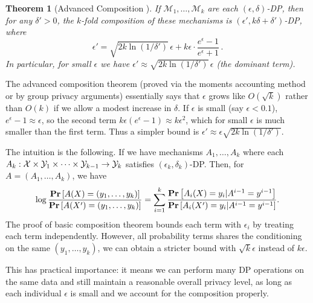 \documentclass[11pt, a4paper]{article}
\newtheorem{theorem}{Theorem}
\begin{document}
\begin{theorem}[Advanced Composition \cite{DworkRoth2014}]
If $\mathcal{M}_1, \dots, \mathcal{M}_k$ are each $(\epsilon,\delta)$-DP, then for any $\delta' > 0$, the $k$-fold composition of these mechanisms is $(\epsilon', k\delta + \delta')$-DP, where 
\[ \epsilon' = \sqrt{2k \ln(1/\delta')} \,\epsilon + k\epsilon \cdot \frac{e^\epsilon - 1}{e^\epsilon+1}\,. \] 
In particular, for small $\epsilon$ we have $\epsilon' \approx \sqrt{2k \ln(1/\delta')} \,\epsilon$ (the dominant term).
\end{theorem}

The advanced composition theorem (proved via the moments accounting method or by group privacy arguments)
essentially says that $\epsilon$ grows like $O(\sqrt{k})$ rather than $O(k)$ if we allow a modest increase in $\delta$.
If $\epsilon$ is small (say $\epsilon < 0.1$), $e^\epsilon - 1 \approx \epsilon$,
so the second term $k\epsilon(e^\epsilon-1) \approx k\epsilon^2$, which for small $\epsilon$ is much smaller than the first term.
Thus a simpler bound is $\epsilon' \approx \epsilon\sqrt{2k \ln(1/\delta')}$.

The intuition is the following.
If we have mechanisms $A_1, \dots, A_k$ where each $A_k:{\cal X} \times {\cal Y}_1\times \cdots \times {\cal Y}_{k-1}\rightarrow {\cal Y}_k$ 
satisfies $(\epsilon_k, \delta_k)$-DP.
Then, for $A = (A_1, \dots, A_k)$, we have
\begin{align*}
    \log \frac{\Prob{A(X) = (y_1, \dots, y_k)}}{\Prob{A(X') = (y_1, \dots, y_k)}}
    = \sum_{i=1}^k \frac{\Prob{A_i(X)=y_i | A^{i-1}=y^{i-1}}}{\Prob{A_i(X')=y_i | A^{i-1}=y^{i-1}}}.
\end{align*}
The proof of basic composition theorem bounds each term with $\epsilon_i$ by treating each term independently.
However, all probability terms shares the conditioning on the same $(y_1, \dots, y_k)$, 
we can obtain a stricter bound with $\sqrt{k}\epsilon$ instead of $k\epsilon$.

This has practical importance: it means we can perform many DP operations on the same data 
and still maintain a reasonable overall privacy level,
as long as each individual $\epsilon$ is small and we account for the composition properly.



\end{document}
